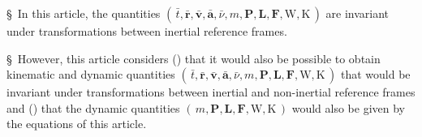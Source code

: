 \documentclass[10pt,fleqn]{article}
\begin{document}
\vspace{+0.60em}

\par {}

\bigskip \smallskip

\noindent \S \ In this article, the quantities $( \, \bar{t}, \bar{\mathbf{r}}, \bar{\mathbf{v}}, \bar{\mathbf{a}}, \bar{\nu}, m, \mathbf{P}, \mathbf{L}, \mathbf{F}, \mathrm{W}, \mathrm{K} \, )$ are invariant under transformations between inertial reference frames.
\par \bigskip \smallskip
\noindent \S \ However, this article considers (\hspace{+0.21em}{\small 1}\hspace{+0.21em}) that it would also be possible to obtain kinematic and dynamic quantities $( \, \bar{t}, \bar{\mathbf{r}}, \bar{\mathbf{v}}, \bar{\mathbf{a}}, \bar{\nu}, m, \mathbf{P}, \mathbf{L}, \mathbf{F}, \mathrm{W}, \mathrm{K} \, )$ that would be invariant under transformations between inertial and non-inertial reference frames and (\hspace{+0.21em}{\small 2}\hspace{+0.21em}) that the dynamic quantities $( \, m, \mathbf{P}, \mathbf{L}, \mathbf{F}, \mathrm{W}, \mathrm{K} \, )$ would also be given by the equations of this article.

\newpage

\par {}

\bigskip \smallskip
\end{document}
